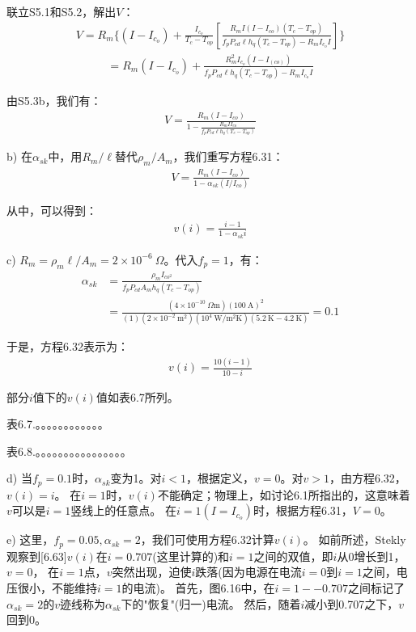 联立S5.1和S5.2，解出$V$：
\begin{align*}%
V=R_m\{(I-I_{c_o})+\frac{I_{c_o}}{T_c-T_{op}}[\frac{R_mI(I-I_{co})(T_c-T_{op})}{f_pP_{cd}\ell h_q(T_c-T_{op})-R_mI_{c_o}I}]\} \tag{S5.3a}
\end{align*}
\begin{align*}%
=R_m(I-I_{c_o})+\frac{R_m^2I_{c_o}(I-I_(co))}{f_pP_{cd}\ell h_q(T_c-T_{op})-R_mI_{c_o}I} \tag{S5.3b}
\end{align*}

由S5.3b，我们有：
\begin{align*}%
V=\frac{R_m(I-I_{co})}{1-\frac{R_mII_{co}}{f_pP_{cd}\ell h_q(T_c-T_{op})}} \tag{6.31}
\end{align*}

b) 在$\alpha_{sk}$中，用$R_m/\ell$替代$\rho_m/A_m$，我们重写方程6.31：
\begin{align*}%
V=\frac{R_m(I-I_{co})}{1-\alpha_{sk}(I/I_{co})} \tag{S5.4}
\end{align*}

从中，可以得到：
\begin{align*}%
v(i)=\frac{i-1}{1-\alpha_{sk}i} \tag{6.32}
\end{align*}

c) $R_m=\rho_m \ell/A_m=2\times 10^{-6}\ \Omega$。代入$f_p=1$，有：
\begin{align*}%
\alpha_{sk}&=\frac{\rho_mI_{co^2}}{f_pP_{cd}A_mh_q(T_c-T_{op})}\\
&=\frac{(4\times10^{-10}\ \Omega\mathrm{m})(100\ \mathrm{A})^2}{(1)(2\times10^{-2}\ \mathrm{m^2})(10^4\ \mathrm{W/m^2K})(5.2\ \mathrm{K}-4.2\ \mathrm{K})}=0.1
\end{align*}

于是，方程6.32表示为：
\begin{align*}%
v(i)=\frac{10(i-1)}{10-i} \tag{S5.5}
\end{align*}

部分$i$值下的$v(i)$值如表6.7所列。

表6.7.。。。。。。。。。。。。

表6.8.。。。。。。。。。。。。。。。。

d) 当$f_p=0.1$时，$\alpha_{sk}$变为1。对$i<1$，根据定义，$v=0$。对$v>1$，由方程6.32，$v(i)=i$。
在$i=1$时，$v(i)$不能确定；物理上，如讨论6.1所指出的，这意味着$v$可以是$i=1$竖线上的任意点。
在$i=1(I=I_{c_o})$时，根据方程6.31，$V=0$。

e) 这里，$f_p = 0.05,\alpha_{sk} = 2$，我们可使用方程6.32计算$v(i)$。
如前所述，Stekly观察到[6.63]$v(i)$在$i=0.707$(这里计算的)和$i= 1$之间的双值，即$i$从0增长到1，$v=0$，
在$i=1$点，$v$突然出现，迫使$i$跌落(因为电源在电流$i=0$到$i=1$之间，电压很小，不能维持$i=1$的电流)。
首先，图6.16中，在$i=1--0.707$之间标记了$\alpha_{sk}=2$的$v$迹线称为$\alpha_{sk}$下的"恢复"(归一)电流。
然后，随着$i$减小到0.707之下，$v$回到0。 

